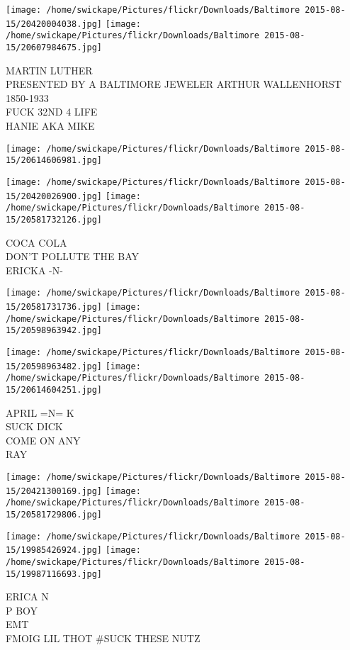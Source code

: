 \documentclass[10pt,letterpaper]{article}
\begin{document}
\texttt{[image: /home/swickape/Pictures/flickr/Downloads/Baltimore 2015-08-15/20420004038.jpg]}
\texttt{[image: /home/swickape/Pictures/flickr/Downloads/Baltimore 2015-08-15/20607984675.jpg]}

MARTIN LUTHER\\
PRESENTED BY A BALTIMORE JEWELER ARTHUR WALLENHORST 1850{-}1933\\
FUCK 32ND 4 LIFE\\
HANIE AKA MIKE
\pagebreak

\texttt{[image: /home/swickape/Pictures/flickr/Downloads/Baltimore 2015-08-15/20614606981.jpg]}

\vspace{0.25in}
\texttt{[image: /home/swickape/Pictures/flickr/Downloads/Baltimore 2015-08-15/20420026900.jpg]}
\texttt{[image: /home/swickape/Pictures/flickr/Downloads/Baltimore 2015-08-15/20581732126.jpg]}

COCA COLA\\
DON'T POLLUTE THE BAY\\
ERICKA {-}N{-}
\pagebreak

\texttt{[image: /home/swickape/Pictures/flickr/Downloads/Baltimore 2015-08-15/20581731736.jpg]}
\texttt{[image: /home/swickape/Pictures/flickr/Downloads/Baltimore 2015-08-15/20598963942.jpg]}

\texttt{[image: /home/swickape/Pictures/flickr/Downloads/Baltimore 2015-08-15/20598963482.jpg]}
\texttt{[image: /home/swickape/Pictures/flickr/Downloads/Baltimore 2015-08-15/20614604251.jpg]}

APRIL =N= K\\
SUCK DICK\\
COME ON ANY\\
RAY
\pagebreak

\texttt{[image: /home/swickape/Pictures/flickr/Downloads/Baltimore 2015-08-15/20421300169.jpg]}
\texttt{[image: /home/swickape/Pictures/flickr/Downloads/Baltimore 2015-08-15/20581729806.jpg]}

\texttt{[image: /home/swickape/Pictures/flickr/Downloads/Baltimore 2015-08-15/19985426924.jpg]}
\texttt{[image: /home/swickape/Pictures/flickr/Downloads/Baltimore 2015-08-15/19987116693.jpg]}

ERICA N\\
P BOY\\
EMT\\
FMOIG LIL THOT \#SUCK THESE NUTZ
\pagebreak
\end{document}

